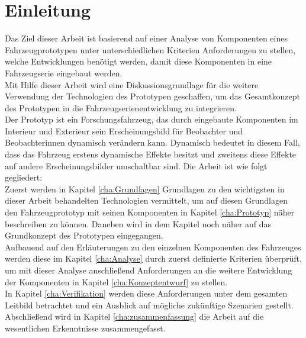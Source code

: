\chapter{Einleitung}
\label{cha:Einleitung}
Das Ziel dieser Arbeit ist basierend auf einer Analyse von Komponenten eines Fahrzeugprototypen unter unterschiedlichen Kriterien Anforderungen  zu stellen, welche Entwicklungen benötigt werden, damit diese Komponenten in eine Fahrzeugserie eingebaut werden.\\
Mit Hilfe dieser Arbeit wird eine Diskussionsgrundlage für die weitere Verwendung der Technologien des Prototypen geschaffen, um das Gesamtkonzept des Prototypen in die Fahrzeugserienentwicklung zu integrieren. \\
Der Prototyp ist ein Forschungsfahrzeug, das durch eingebaute Komponenten im Interieur und Exterieur sein Erscheinungsbild für Beobachter und Beobachterinnen dynamisch verändern kann. Dynamisch bedeutet in diesem Fall, dass das Fahrzeug erstens dynamische Effekte besitzt und zweitens diese Effekte auf andere Erscheinungsbilder umschaltbar sind.
Die Arbeit ist wie folgt gegliedert:\\
Zuerst werden in Kapitel \ref{cha:Grundlagen} Grundlagen zu den wichtigsten in dieser Arbeit behandelten Technologien vermittelt, um auf diesen Grundlagen den Fahrzeugprototyp mit seinen Komponenten in Kapitel \ref{cha:Prototyp} näher beschreiben zu können. Daneben wird in dem Kapitel noch näher auf das Grundkonzept des Prototypen eingegangen.\\
Aufbauend auf den Erläuterungen zu den einzelnen Komponenten des Fahrzeuges werden diese im Kapitel \ref{cha:Analyse} durch zuerst definierte Kriterien überprüft, um mit dieser Analyse anschließend Anforderungen an die weitere Entwicklung der Komponenten in Kapitel \ref{cha:Konzeptentwurf} zu stellen.\\
In Kapitel \ref{cha:Verifikation} werden diese Anforderungen unter dem gesamten Leitbild betrachtet und ein Ausblick auf mögliche zukünftige Szenarien gestellt. Abschließend wird in Kapitel \ref{cha:zusammenfassung} die Arbeit auf die wesentlichen Erkenntnisse zusammengefasst.